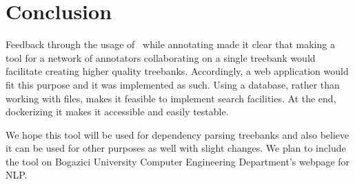 \section{Conclusion}
\label{sec:conclusion}
Feedback through the usage of \boatvone\  while annotating \bountreebank{} made it clear that making a tool for a network of annotators collaborating on a single treebank would facilitate creating higher quality treebanks.
Accordingly, a web application would fit this purpose and it was implemented as such.
Using a database, rather than working with \conllu{} files, makes it feasible to implement search facilities.
At the end, dockerizing it makes it accessible and easily testable.

We hope this tool will be used for dependency parsing treebanks and also believe it can be used for other purposes as well with slight changes.
We plan to include the tool on Bogazici University Computer Engineering Department's webpage for NLP.
